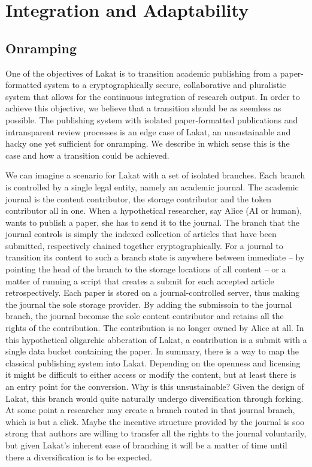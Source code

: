 \section{Integration and Adaptability}
\label{sc:integrationadaptability}


\subsection{Onramping}
\label{ssc:onramping}

One of the objectives of Lakat is to transition academic publishing from a paper-formatted system to a cryptographically secure, collaborative and pluralistic system that allows for the continuous integration of research output. In order to achieve this objective, we believe that a transition should be as seemless as possible. The publishing system with isolated paper-formatted publications and intransparent review processes is an edge case of Lakat, an unsustainable and hacky one yet sufficient for onramping. We describe in which sense this is the case and how a transition could be achieved.

We can imagine a scenario for Lakat with a set of isolated branches. Each branch is controlled by a single legal entity, namely an academic journal. The academic journal is the content contributor, the storage contributor and the token contributor all in one. When a hypothetical researcher, say Alice (AI or human), wants to publish a paper, she has to send it to the journal. The branch that the journal  controls is simply the indexed collection of articles that have been submitted, respectively chained together cryptographically. For a journal to transition its content to such a branch state is anywhere between immediate -- by pointing the head of the branch to the storage locations of all content -- or a matter of running a script that creates a submit for each accepted article retrospectively.  Each paper is stored on a journal-controlled server, thus making the journal the sole storage provider. By adding the submissoin to the journal branch, the journal becomse the sole content contributor and retains all the rights of the contribution. The contribution is no longer owned by Alice at all. In this hypothetical oligarchic abberation of Lakat, a contribution is a submit with a single data bucket containing the paper. In summary, there is a way to map the classical publishing system into Lakat. Depending on the openness and licensing it might be difficult to either access or modify the content, but at least there is an entry point for the conversion.
Why is this unsustainable?  Given the design of Lakat, this branch would quite naturally undergo diversification through forking. At some point a researcher may create a branch routed in that journal branch, which is but a click. Maybe the incentive structure provided by the journal is soo strong that authors are willing to transfer all the rights to the journal voluntarily, but given Lakat's inherent ease of branching it will be a matter of time until there a diversification is to be expected.



